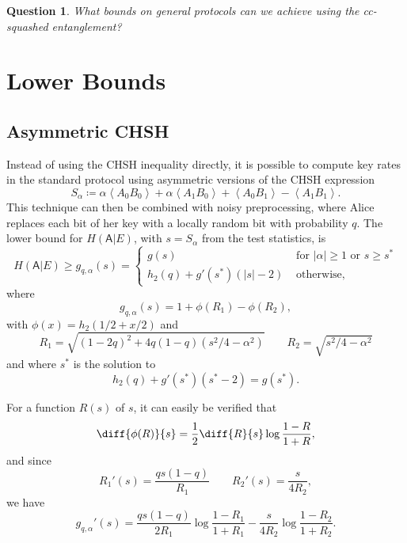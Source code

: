 \documentclass[10pt, a4paper]{article}
\numberwithin{equation}{section} %
\theoremstyle{definition}
\theoremstyle{plain}
\newtheorem{question}{Question}
\newcommand{\abs}[1]{\left\lvert#1\right\rvert}
\newcommand{\?}{\mathrel{?}} %
\newcommand{\angleb}[1]{\left\langle #1 \right\rangle} %
\newcommand{\crv}[1]{\mathsf{#1}}
\begin{document}
      \begin{question}
        What bounds on general protocols can we achieve using the cc-squashed entanglement?
      \end{question}

      \section{Lower Bounds}\label{sec:lbound}

      \subsection{Asymmetric CHSH}

      Instead of using the CHSH inequality directly, it is possible to compute key rates in the standard protocol using asymmetric versions of the CHSH expression
      \begin{equation}
        S_{\alpha} \coloneqq \alpha\angleb{A_0 B_0} + \alpha\angleb{A_1 B_0} + \angleb{A_0 B_1} - \angleb{A_1 B_1}.
      \end{equation}
      This technique can then be combined with noisy preprocessing, where Alice replaces each bit of her key with a locally random bit with probability \(q\). The lower bound for \(H(\crv{A}|E)\), with \(s = S_{\alpha}\) from the test statistics, is
      \begin{equation} H(\crv{A}|E) \geq g_{q,\alpha}(s) = \begin{cases}
        g(s) & \text{ for } \abs{\alpha} \geq 1 \text{ or } s \geq s^* \\
        h_2(q) + g'(s^*)(\abs{s}-2) & \text{ otherwise},
      \end{cases}
    \end{equation}
    where
    \begin{equation}
      g_{q,\alpha}(s) = 1 + \phi\left(R_1\right) - \phi\left(R_2\right),
    \end{equation}
    with \(\phi(x) = h_2(1/2 + x/2)\) and
    \begin{equation} 
      R_1 = \sqrt{{(1-2q)}^2 + 4q(1-q)(s^2/4-\alpha^2)} \qquad R_2 = \sqrt{s^2/4-\alpha^2}
    \end{equation}
    and where \(s^*\) is the solution to
    \begin{equation}\label{eqn:sstar}
      h_2(q) + g'(s^*) (s^*-2) = g(s^*).
    \end{equation}

    For a function \(R(s)\) of \(s\), it can easily be verified that
    \begin{equation}
      \diff{\phi(R)}{s} = \frac{1}{2} \diff{R}{s} \log\frac{1-R}{1+R},
    \end{equation}
    and since
    \begin{equation} 
      R_1'(s) = \frac{qs(1-q)}{R_1} \qquad R_2'(s) = \frac{s}{4R_2},
    \end{equation}
    we have
    \begin{equation}\label{eqn:diffg}
      g_{q,\alpha}'(s) = \frac{qs(1-q)}{2R_1} \log\frac{1-R_1}{1+R_1} - \frac{s}{4R_2} \log\frac{1-R_2}{1+R_2}.
    \end{equation}
\end{document}
